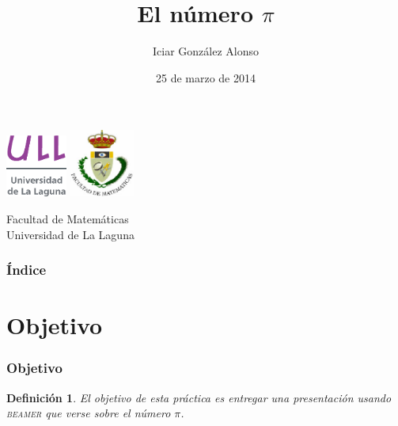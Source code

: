 \documentclass{beamer}
\title[Número $\pi$]{El número $\pi$ }
\author[Iciar González Alonso]{Iciar González Alonso}
\date[25-03-2014]{25 de marzo de 2014}
\newtheorem{definicion}{Definición}
\begin{document}
  
\begin{frame}

  \includegraphics[width=0.15\textwidth]{img/ullesc}
  \hspace*{7.0cm}
  \includegraphics[width=0.16\textwidth]{img/fmatesc}
  \titlepage

  \begin{small}
    \begin{center}
     Facultad de Matemáticas \\
     Universidad de La Laguna
    \end{center}
  \end{small}

\end{frame}

\begin{frame}
  \frametitle{Índice}
  \tableofcontents[pausesections]
\end{frame}


\section{Objetivo}


\begin{frame}

\frametitle{Objetivo}

\begin{definicion}

El objetivo de esta práctica es entregar una presentación usando \textsc{beamer} que verse sobre el número $\pi$.

\end{definicion}

\end{frame}
\end{document}
